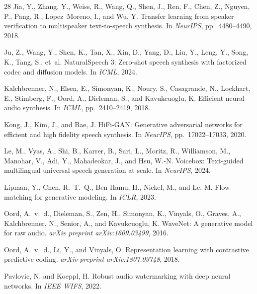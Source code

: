 \documentclass[11pt,a4paper]{article}
\begin{document}
\begin{thebibliography}{28}
Jia, Y., Zhang, Y., Weiss, R., Wang, Q., Shen, J., Ren, F., Chen, Z., Nguyen, P., Pang, R., Lopez~Moreno, I., and Wu, Y.
\newblock Transfer learning from speaker verification to multispeaker text-to-speech synthesis.
\newblock In \emph{NeurIPS}, pp.\ 4480--4490, 2018.

Ju, Z., Wang, Y., Shen, K., Tan, X., Xin, D., Yang, D., Liu, Y., Leng, Y., Song, K., Tang, S., et~al.
\newblock NaturalSpeech 3: Zero-shot speech synthesis with factorized codec and diffusion models.
\newblock In \emph{ICML}, 2024.

Kalchbrenner, N., Elsen, E., Simonyan, K., Noury, S., Casagrande, N., Lockhart, E., Stimberg, F., Oord, A., Dieleman, S., and Kavukcuoglu, K.
\newblock Efficient neural audio synthesis.
\newblock In \emph{ICML}, pp.\ 2410--2419, 2018.

Kong, J., Kim, J., and Bae, J.
\newblock HiFi-GAN: Generative adversarial networks for efficient and high fidelity speech synthesis.
\newblock In \emph{NeurIPS}, pp.\ 17022--17033, 2020.

Le, M., Vyas, A., Shi, B., Karrer, B., Sari, L., Moritz, R., Williamson, M., Manohar, V., Adi, Y., Mahadeokar, J., and Hsu, W.-N.
\newblock Voicebox: Text-guided multilingual universal speech generation at scale.
\newblock In \emph{NeurIPS}, 2024.

Lipman, Y., Chen, R.~T.~Q., Ben-Hamu, H., Nickel, M., and Le, M.
\newblock Flow matching for generative modeling.
\newblock In \emph{ICLR}, 2023.

Oord, A.~v.~d., Dieleman, S., Zen, H., Simonyan, K., Vinyals, O., Graves, A., Kalchbrenner, N., Senior, A., and Kavukcuoglu, K.
\newblock WaveNet: A generative model for raw audio.
\newblock \emph{arXiv preprint arXiv:1609.03499}, 2016.

Oord, A.~v.~d., Li, Y., and Vinyals, O.
\newblock Representation learning with contrastive predictive coding.
\newblock \emph{arXiv preprint arXiv:1807.03748}, 2018.

Pavlovic, N. and Koeppl, H.
\newblock Robust audio watermarking with deep neural networks.
\newblock In \emph{IEEE WIFS}, 2022.


\end{thebibliography}
\end{document}
